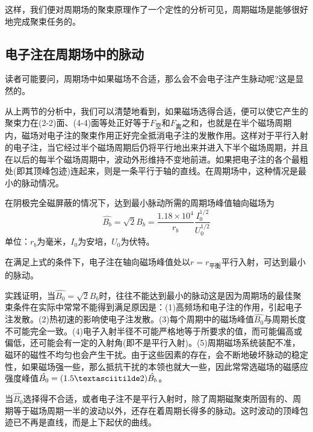 这样，我们便对周期场的聚束原理作了一个定性的分析可见，周期磁场是能够很好地完成聚束任务的。


\subsection{电子注在周期场中的脉动}
读者可能要问，周期场中如果磁场不合适，那么会不会电子注产生脉动呢?这是显然的。

从上两节的分析中，我们可以清楚地看到，如果磁场选得合适，便可以使它产生的聚束力在(2-2)面、(4-4)面等处正好等于$ F_{\textrm{空}}$和$ F_{\textrm{离}}$之和，也就是在半个磁场周期内，磁场对电子注的聚束作用正好完全抵消电子注的发散作用。这样对于平行入射的电子注，当它经过半个磁场周期后仍将平行地出来并进入下半个磁场周期，并且在以后的每半个磁场周期中，波动外形维持不变地前进。如果把电子注的各个最粗处(即其顶峰包迹)连起来，则是一条平行于轴的直线。在周期场中，这种情况是最小的脉动情况。


在阴极完全磁屏蔽的情况下，达到最小脉动所需的周期场峰值轴向磁场为
\begin{equation} \label{eq:ch7-6}
	\hat{B_b} = \sqrt{2}B_b = \frac{1.18\times 10^4}{r_b}\frac{I_0^{1/2}}{U_0^{1/2}}
\end{equation}
单位：$ r_b $为毫米，$ I_0 $为安培，$ U_0 $为伏特。


在满足上式的条件下，电子注在轴向磁场峰值处以$ r = r_{\textrm{平衡}} $平行入射，可达到最小的脉动。


实践证明，当$ \hat{B_0}=\sqrt{2} B_b$时，往往不能达到最小的脉动这是因为周期场的最佳聚束条件在实际中常常不能得到满足原因是：(1)高频场和电子注的作用，引起电子注发散。(2)热初速的影响使电子注发散。(3)每个周期中的磁场峰值$ \hat{B_0} $与周期长度不可能完全一致。(4)电子入射半径不可能严格地等于所要求的值，而可能偏高或偏低，还可能会有一定的入射角(即不是平行入射)。(5)周期磁场系统装配不准，磁环的磁性不均匀也会产生干扰。由于这些因素的存在，会不断地破坏脉动的稳定性，如果磁场强一些，那么抵抗干扰的本领也就大一些，因此常常选磁场的磁感应强度峰值$ \hat{B_0} = (1.5\textasciitilde 2)\hat{B_{b}} $。


当$ \hat{B_0} $选择得不合适，或者电子注不是平行入射时，除了周期磁聚束所固有的、周期等于磁场周期一半的波动以外，还存在着周期长得多的脉动。这时波动的顶峰包迹已不再是直线，而是上下起伏的曲线。


